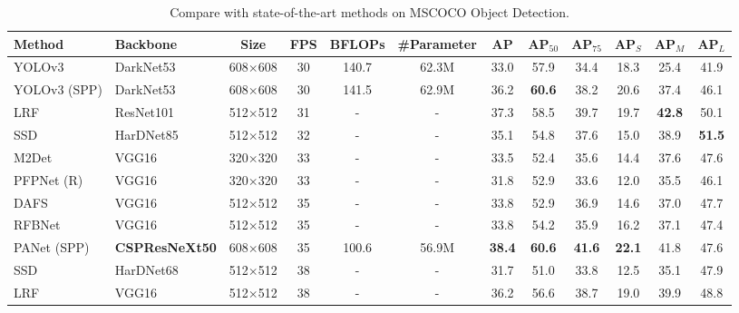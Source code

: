 \documentclass{article}
\begin{document}
\begin{table*}[t]
	\centering
	\begin{threeparttable}[t]
		\footnotesize
\caption{Compare with state-of-the-art methods on MSCOCO Object Detection.}
		\label{table:mscoco}
		\setlength\tabcolsep{3.5pt}
		\begin{tabular}{llcccccccccc}
			\toprule
			Method & Backbone & Size & FPS & BFLOPs & \#Parameter & AP & AP$_{50}$ & AP$_{75}$ & AP$_{S}$ & AP$_{M}$ & AP$_{L}$ \\			
			\midrule	
			YOLOv3 \cite{redmon2018yolov3} & DarkNet53 \cite{redmon2018yolov3} & 608$\times$608 & 30 & 140.7 & 62.3M & 33.0 & 57.9 & 34.4 & 18.3 & 25.4 & 41.9 \\
			YOLOv3 (SPP) \cite{redmon2018yolov3} & DarkNet53 \cite{redmon2018yolov3} & 608$\times$608 & 30 & 141.5 & 62.9M & 36.2 & \textbf{60.6} & 38.2 & 20.6 & 37.4 & 46.1 \\	
			LRF \cite{wang2019learning} & ResNet101 \cite{he2016deep} & 512$\times$512 & 31 & - & - & 37.3 & 58.5 & 39.7 & 19.7 & \textbf{42.8} & 50.1 \\
			SSD \cite{liu2016ssd} & HarDNet85 \cite{chao2019hardnet} & 512$\times$512 & 32 & - & - & 35.1 & 54.8 & 37.6 & 15.0 & 38.9 & \textbf{51.5} \\	
			M2Det \cite{zhao2019m2det} & VGG16 \cite{simonyan2014very} & 320$\times$320 & 33 & - & - & 33.5 & 52.4 & 35.6 & 14.4 & 37.6 & 47.6 \\
			PFPNet (R) \cite{kim2018parallel} & VGG16 \cite{simonyan2014very} & 320$\times$320 & 33 & - & - & 31.8 & 52.9 & 33.6 & 12.0 & 35.5 & 46.1 \\	
			DAFS \cite{li2019dynamic} & VGG16 \cite{simonyan2014very} & 512$\times$512 & 35 & - & - & 33.8 & 52.9 & 36.9 & 14.6 & 37.0 & 47.7 \\
			RFBNet \cite{liu2018receptive} & VGG16 \cite{simonyan2014very} & 512$\times$512 & 35 & - & - & 33.8 & 54.2 & 35.9 & 16.2 & 37.1 & 47.4 \\
			PANet (SPP) \cite{liu2018path} & \textbf{CSPResNeXt50} &  608$\times$608 & 35 & 100.6 & 56.9M & \textbf{38.4} & \textbf{60.6} & \textbf{41.6} & \textbf{22.1} & 41.8 & 47.6 \\
			SSD \cite{liu2016ssd} & HarDNet68 \cite{chao2019hardnet} & 512$\times$512 & 38 & - & - & 31.7 & 51.0 & 33.8 & 12.5 & 35.1 & 47.9 \\	
			LRF \cite{wang2019learning} & VGG16 \cite{simonyan2014very} & 512$\times$512 & 38 & - & - & 36.2 & 56.6 & 38.7 & 19.0 & 39.9 & 48.8 \\

\end{tabular}
\end{threeparttable}
\end{table*}
\end{document}
